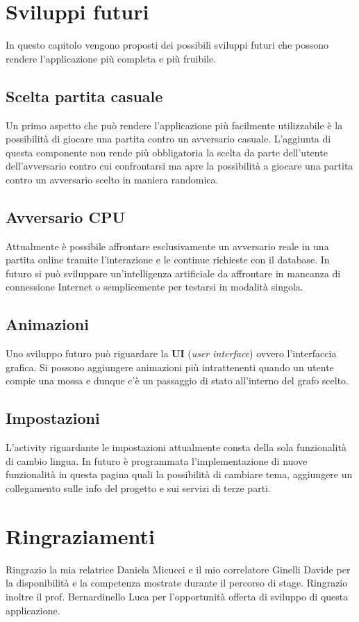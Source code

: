 \documentclass[a4paper,11pt,twoside,openright]{report}
\begin{document}
\chapter{Sviluppi futuri}
In questo capitolo vengono proposti dei possibili sviluppi futuri che possono rendere l'applicazione più completa e più fruibile.

\section{Scelta partita casuale}
Un primo aspetto che può rendere l'applicazione più facilmente utilizzabile è la possibilità di giocare una partita contro un avversario casuale. L'aggiunta di questa componente non rende più obbligatoria la scelta da parte dell'utente dell'avversario contro cui confrontarsi ma apre la possibilità a giocare una partita contro un avversario scelto in maniera randomica.

\section{Avversario CPU}
Attualmente è possibile affrontare esclusivamente un avversario reale in una partita online tramite l'interazione e le continue richieste con il database. In futuro si può sviluppare un'intelligenza artificiale da affrontare in mancanza di connessione Internet o semplicemente per testarsi in modalità singola.

\section{Animazioni}
Uno sviluppo futuro può riguardare la \textbf{UI} (\textit{user interface}) ovvero l'interfaccia grafica. Si possono aggiungere animazioni più intrattenenti quando un utente compie una mossa e dunque c'è un passaggio di stato all'interno del grafo scelto.

\section{Impostazioni}
L'activity riguardante le impostazioni attualmente consta della sola funzionalità di cambio lingua. In futuro è programmata l'implementazione di nuove funzionalità in questa pagina quali la possibilità di cambiare tema, aggiungere un collegamento sulle info del progetto e sui servizi di terze parti.

\chapter*{Ringraziamenti}
Ringrazio la mia relatrice Daniela Micucci e il mio correlatore Ginelli Davide per la disponibilità e la competenza mostrate durante il percorso di stage. Ringrazio inoltre il prof. Bernardinello Luca per l'opportunità offerta di sviluppo di questa applicazione.\\
\end{document}
